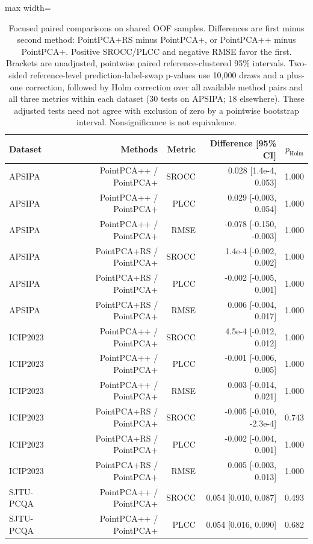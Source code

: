 \begin{table}[t!]
\centering
\caption{Focused paired comparisons on shared OOF samples. Differences are first minus second method: PointPCA+RS minus PointPCA+, or PointPCA++ minus PointPCA+. Positive SROCC/PLCC and negative RMSE favor the first. Brackets are unadjusted, pointwise paired reference-clustered 95\% intervals. Two-sided reference-level prediction-label-swap p-values use 10,000 draws and a plus-one correction, followed by Holm correction over all available method pairs and all three metrics within each dataset (30 tests on APSIPA; 18 elsewhere). These adjusted tests need not agree with exclusion of zero by a pointwise bootstrap interval. Nonsignificance is not equivalence.}
\label{tab_review_pairwise}
\scriptsize
\begin{adjustbox}{max width=\textwidth}
\begin{tabular}{lrrrr}
\toprule
Dataset & Methods & Metric & Difference [95\% CI] & $p_{\mathrm{Holm}}$ \\
\midrule
APSIPA & PointPCA++ / PointPCA+ & SROCC & 0.028 [1.4e-4, 0.053] & 1.000 \\
APSIPA & PointPCA++ / PointPCA+ & PLCC & 0.029 [-0.003, 0.054] & 1.000 \\
APSIPA & PointPCA++ / PointPCA+ & RMSE & -0.078 [-0.150, -0.003] & 1.000 \\
APSIPA & PointPCA+RS / PointPCA+ & SROCC & 1.4e-4 [-0.002, 0.002] & 1.000 \\
APSIPA & PointPCA+RS / PointPCA+ & PLCC & -0.002 [-0.005, 0.001] & 1.000 \\
APSIPA & PointPCA+RS / PointPCA+ & RMSE & 0.006 [-0.004, 0.017] & 1.000 \\
ICIP2023 & PointPCA++ / PointPCA+ & SROCC & 4.5e-4 [-0.012, 0.012] & 1.000 \\
ICIP2023 & PointPCA++ / PointPCA+ & PLCC & -0.001 [-0.006, 0.005] & 1.000 \\
ICIP2023 & PointPCA++ / PointPCA+ & RMSE & 0.003 [-0.014, 0.021] & 1.000 \\
ICIP2023 & PointPCA+RS / PointPCA+ & SROCC & -0.005 [-0.010, -2.3e-4] & 0.743 \\
ICIP2023 & PointPCA+RS / PointPCA+ & PLCC & -0.002 [-0.004, 0.001] & 1.000 \\
ICIP2023 & PointPCA+RS / PointPCA+ & RMSE & 0.005 [-0.003, 0.013] & 1.000 \\
SJTU-PCQA & PointPCA++ / PointPCA+ & SROCC & 0.054 [0.010, 0.087] & 0.493 \\
SJTU-PCQA & PointPCA++ / PointPCA+ & PLCC & 0.054 [0.016, 0.090] & 0.682 \\

\end{tabular}
\end{adjustbox}
\end{table}
